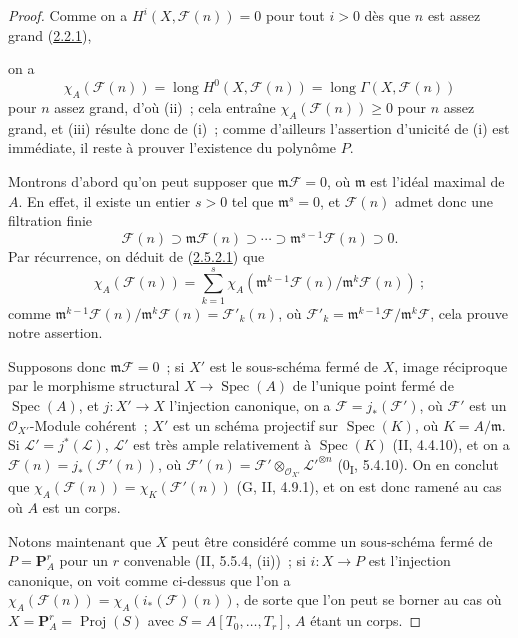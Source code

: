 \begin{proof}
Comme on a $H^i(X,\mathcal F(n))=0$ pour tout $i>0$ dès que $n$ est
assez grand (\hyperref[III.2.2.1-fr]{2.2.1}),

on a
\[
\chi_A(\mathcal F(n))=\operatorname{long}H^0(X,\mathcal F(n))
=\operatorname{long}\Gamma(X,\mathcal F(n))
\]
pour $n$ assez grand, d'où (ii)~; cela entraîne
$\chi_A(\mathcal F(n))\geq0$ pour $n$ assez grand, et (iii) résulte donc
de (i)~; comme d'ailleurs l'assertion d'unicité de (i) est immédiate, il
reste à prouver l'existence du polynôme $P$.

Montrons d'abord qu'on peut supposer que $\mathfrak m\mathcal F=0$, où
$\mathfrak m$ est l'idéal maximal de $A$. En effet, il existe un entier
$s>0$ tel que $\mathfrak m^s=0$, et $\mathcal F(n)$ admet donc une
filtration finie
\[
\mathcal F(n)\supset\mathfrak m\mathcal F(n)\supset\cdots
\supset\mathfrak m^{s-1}\mathcal F(n)\supset0.
\]
Par récurrence, on déduit de
(\hyperref[III.2.5.2.1-fr]{2.5.2.1}) que
\[
\chi_A(\mathcal F(n))=\sum_{k=1}^{s}
\chi_A(\mathfrak m^{k-1}\mathcal F(n)/\mathfrak m^k\mathcal F(n))~;
\]
comme
$\mathfrak m^{k-1}\mathcal F(n)/\mathfrak m^k\mathcal F(n)
=\mathcal F'_k(n)$, où
$\mathcal F'_k=\mathfrak m^{k-1}\mathcal F/\mathfrak m^k\mathcal F$,
cela prouve notre assertion.

Supposons donc $\mathfrak m\mathcal F=0$~; si $X'$ est le sous-schéma
fermé de $X$, image réciproque par le morphisme structural
$X\to\operatorname{Spec}(A)$ de l'unique point fermé de
$\operatorname{Spec}(A)$, et $j:X'\to X$ l'injection canonique, on a
$\mathcal F=j_*(\mathcal F')$, où $\mathcal F'$ est un
$\mathcal O_{X'}$-Module cohérent~; $X'$ est un schéma projectif sur
$\operatorname{Spec}(K)$, où $K=A/\mathfrak m$. Si
$\mathcal L'=j^*(\mathcal L)$, $\mathcal L'$ est très ample relativement
à $\operatorname{Spec}(K)$ (II, 4.4.10), et on a
$\mathcal F(n)=j_*(\mathcal F'(n))$, où
$\mathcal F'(n)=\mathcal F'\otimes_{\mathcal O_{X'}}
\mathcal L'^{\otimes n}$ (0\textsubscript{I}, 5.4.10). On en conclut que
$\chi_A(\mathcal F(n))=\chi_K(\mathcal F'(n))$ (G, II, 4.9.1), et on est
donc ramené au cas où $A$ est un corps.

Notons maintenant que $X$ peut être considéré comme un sous-schéma
fermé de $P=\mathbf P_A^r$ pour un $r$ convenable (II, 5.5.4, (ii))~;
si $i:X\to P$ est l'injection canonique, on voit comme ci-dessus que l'on
a $\chi_A(\mathcal F(n))=\chi_A(i_*(\mathcal F)(n))$, de sorte que l'on
peut se borner au cas où $X=\mathbf P_A^r=\operatorname{Proj}(S)$ avec
$S=A[T_0,\ldots,T_r]$, $A$ étant un corps.


\end{proof}
